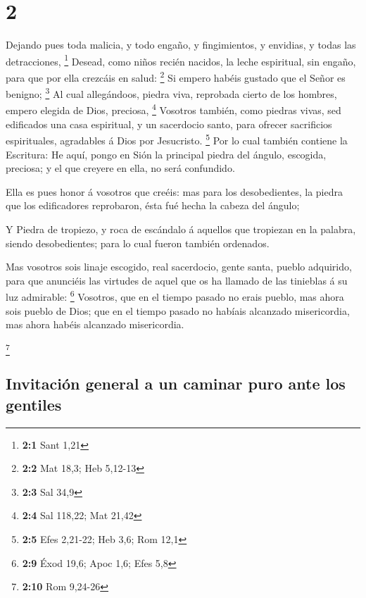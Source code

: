 \hypertarget{section-1}{%
\section{2}\label{section-1}}

 Dejando pues toda malicia, y todo engaño, y fingimientos, y
envidias, y todas las detracciones, \footnote{\textbf{2:1} Sant 1,21}
 Desead, como niños recién nacidos, la leche espiritual, sin
engaño, para que por ella crezcáis en salud: \footnote{\textbf{2:2} Mat
  18,3; Heb 5,12-13}  Si empero habéis gustado que el Señor
es benigno; \footnote{\textbf{2:3} Sal 34,9}  Al cual
allegándoos, piedra viva, reprobada cierto de los hombres, empero
elegida de Dios, preciosa, \footnote{\textbf{2:4} Sal 118,22; Mat 21,42}
 Vosotros también, como piedras vivas, sed edificados una
casa espiritual, y un sacerdocio santo, para ofrecer sacrificios
espirituales, agradables á Dios por Jesucristo. \footnote{\textbf{2:5}
  Efes 2,21-22; Heb 3,6; Rom 12,1}  Por lo cual también
contiene la Escritura: He aquí, pongo en Sión la principal piedra del
ángulo, escogida, preciosa; y el que creyere en ella, no será
confundido.

 Ella es pues honor á vosotros que creéis: mas para los
desobedientes, la piedra que los edificadores reprobaron, ésta fué hecha
la cabeza del ángulo;

 Y Piedra de tropiezo, y roca de escándalo á aquellos que
tropiezan en la palabra, siendo desobedientes; para lo cual fueron
también ordenados.

 Mas vosotros sois linaje escogido, real sacerdocio, gente
santa, pueblo adquirido, para que anunciéis las virtudes de aquel que os
ha llamado de las tinieblas á su luz admirable: \footnote{\textbf{2:9}
  Éxod 19,6; Apoc 1,6; Efes 5,8}  Vosotros, que en el
tiempo pasado no erais pueblo, mas ahora sois pueblo de Dios; que en el
tiempo pasado no habíais alcanzado misericordia, mas ahora habéis
alcanzado misericordia.

\footnote{\textbf{2:10} Rom 9,24-26}

\hypertarget{invitaciuxf3n-general-a-un-caminar-puro-ante-los-gentiles}{%
\subsection{Invitación general a un caminar puro ante los
gentiles}\label{invitaciuxf3n-general-a-un-caminar-puro-ante-los-gentiles}}

